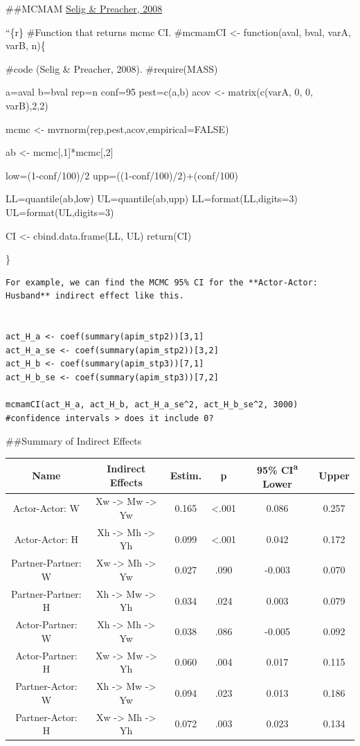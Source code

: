 \documentclass[
  man,floatsintext]{apa6}
\begin{document}
\#\#MCMAM \href{http://www.quantpsy.org/medmc/medmc.htm}{Selig \& Preacher, 2008}

``\{r\}
\#Function that returns mcmc CI.
\#mcmamCI \textless- function(aval, bval, varA, varB, n)\{

\#code (Selig \& Preacher, 2008).
\#require(MASS)

a=aval
b=bval
rep=n
conf=95
pest=c(a,b)
acov \textless- matrix(c(varA, 0, 0, varB),2,2)

mcmc \textless- mvrnorm(rep,pest,acov,empirical=FALSE)

ab \textless- mcmc{[},1{]}*mcmc{[},2{]}

low=(1-conf/100)/2
upp=((1-conf/100)/2)+(conf/100)

LL=quantile(ab,low)
UL=quantile(ab,upp)
LL=format(LL,digits=3)
UL=format(UL,digits=3)

CI \textless- cbind.data.frame(LL, UL)
return(CI)

\}

\begin{verbatim}
For example, we can find the MCMC 95% CI for the **Actor-Actor: Husband** indirect effect like this.


act_H_a <- coef(summary(apim_stp2))[3,1]
act_H_a_se <- coef(summary(apim_stp2))[3,2]
act_H_b <- coef(summary(apim_stp3))[7,1]
act_H_b_se <- coef(summary(apim_stp3))[7,2]

mcmamCI(act_H_a, act_H_b, act_H_a_se^2, act_H_b_se^2, 3000)
#confidence intervals > does it include 0?
\end{verbatim}

\#\#Summary of Indirect Effects

\begin{longtable}[]{@{}cccccc@{}}
\toprule
Name & Indirect Effects & Estim. & p & 95\% CI\textsuperscript{a} Lower & Upper \\
\midrule
\endhead
Actor-Actor: W & Xw -\textgreater{} Mw -\textgreater{} Yw & 0.165 & \textless.001 & 0.086 & 0.257 \\
Actor-Actor: H & Xh -\textgreater{} Mh -\textgreater{} Yh & 0.099 & \textless.001 & 0.042 & 0.172 \\
Partner-Partner: W & Xw -\textgreater{} Mh -\textgreater{} Yw & 0.027 & .090 & -0.003 & 0.070 \\
Partner-Partner: H & Xh -\textgreater{} Mw -\textgreater{} Yh & 0.034 & .024 & 0.003 & 0.079 \\
Actor-Partner: W & Xh -\textgreater{} Mh -\textgreater{} Yw & 0.038 & .086 & -0.005 & 0.092 \\
Actor-Partner: H & Xw -\textgreater{} Mw -\textgreater{} Yh & 0.060 & .004 & 0.017 & 0.115 \\
Partner-Actor: W & Xh -\textgreater{} Mw -\textgreater{} Yw & 0.094 & .023 & 0.013 & 0.186 \\
Partner-Actor: H & Xw -\textgreater{} Mh -\textgreater{} Yh & 0.072 & .003 & 0.023 & 0.134 \\
\bottomrule
\end{longtable}
\end{document}
